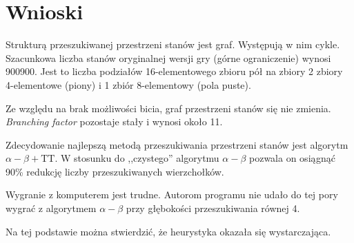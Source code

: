 \documentclass{scrartcl}
\begin{document}
\newpage
\clearpage

\section{Wnioski}

Strukturą przeszukiwanej przestrzeni stanów jest graf. Występują w
nim cykle. Szacunkowa liczba stanów oryginalnej wersji gry
(górne ograniczenie) wynosi 900900. Jest to liczba podziałów 
16-elementowego zbioru pół na zbiory 2 zbiory 4-elementowe (piony) i
1 zbiór 8-elementowy (pola puste).

Ze względu na brak możliwości bicia, graf przestrzeni stanów się 
nie zmienia. \emph{Branching factor} pozostaje stały i wynosi około 11.

Zdecydowanie najlepszą metodą przeszukiwania przestrzeni stanów 
jest algorytm $\alpha - \beta + \text{TT}$. W stosunku do 
,,czystego'' algorytmu $\alpha - \beta$ pozwala on osiągnąć 
90\% redukcję liczby przeszukiwanych wierzchołków.

Wygranie z komputerem jest trudne. Autorom programu nie udało 
do tej pory wygrać z algorytmem $\alpha - \beta$ przy głębokości
przeszukiwania równej 4.

Na tej podstawie można stwierdzić, że heurystyka okazała się
wystarczająca.
\end{document}
